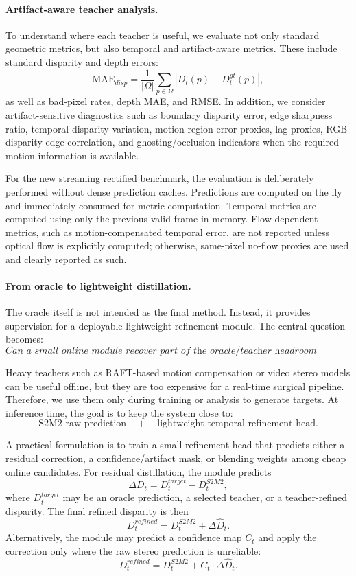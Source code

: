 \documentclass[11pt,a4paper]{article}
\begin{document}
\paragraph{Artifact-aware teacher analysis.}
To understand where each teacher is useful, we evaluate not only standard
geometric metrics, but also temporal and artifact-aware metrics. These include
standard disparity and depth errors:
\[
\mathrm{MAE}_{disp}
=
\frac{1}{|\Omega|}
\sum_{p \in \Omega}
\left|D_t(p)-D_t^{gt}(p)\right|,
\]
as well as bad-pixel rates, depth MAE, and RMSE. In addition, we consider
artifact-sensitive diagnostics such as boundary disparity error, edge sharpness
ratio, temporal disparity variation, motion-region error proxies, lag proxies,
RGB-disparity edge correlation, and ghosting/occlusion indicators when the
required motion information is available.

For the new streaming rectified benchmark, the evaluation is deliberately
performed without dense prediction caches. Predictions are computed on the fly
and immediately consumed for metric computation. Temporal metrics are computed
using only the previous valid frame in memory. Flow-dependent metrics, such as
motion-compensated temporal error, are not reported unless optical flow is
explicitly computed; otherwise, same-pixel no-flow proxies are used and clearly
reported as such.

\paragraph{From oracle to lightweight distillation.}
The oracle itself is not intended as the final method. Instead, it provides
supervision for a deployable lightweight refinement module. The central question
becomes:
\[
\textit{Can a small online module recover part of the oracle/teacher headroom
without running heavy teachers at inference time?}
\]

Heavy teachers such as RAFT-based motion compensation or video stereo models can
be useful offline, but they are too expensive for a real-time surgical pipeline.
Therefore, we use them only during training or analysis to generate targets. At
inference time, the goal is to keep the system close to:
\[
\text{S2M2 raw prediction}
\quad + \quad
\text{lightweight temporal refinement head}.
\]

A practical formulation is to train a small refinement head that predicts either
a residual correction, a confidence/artifact mask, or blending weights among
cheap online candidates. For residual distillation, the module predicts
\[
\Delta D_t = D_t^{target} - D_t^{S2M2},
\]
where $D_t^{target}$ may be an oracle prediction, a selected teacher, or a
teacher-refined disparity. The final refined disparity is then
\[
D_t^{refined} = D_t^{S2M2} + \Delta \hat{D}_t.
\]
Alternatively, the module may predict a confidence map $C_t$ and apply the
correction only where the raw stereo prediction is unreliable:
\[
D_t^{refined}
=
D_t^{S2M2}
+
C_t \cdot \Delta \hat{D}_t.
\]
\end{document}
